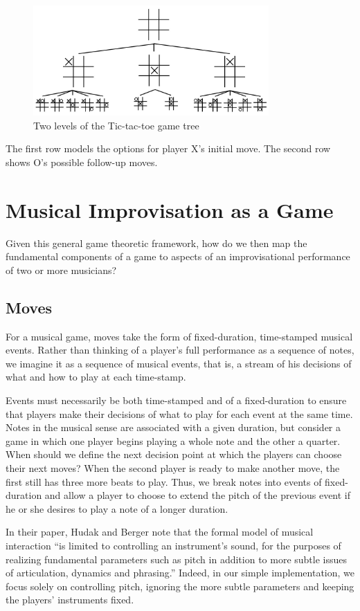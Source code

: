 \documentclass{article}
\begin{document}
\begin{figure}
\centering
\includegraphics[width=90mm]{ttt.jpg}
\caption{Two levels of the Tic-tac-toe game tree}
\end{figure}

The first row models the options for player X's initial move.  The second row 
shows O's possible follow-up moves.

\section{Musical Improvisation as a
Game}

Given this general game theoretic framework, how do we then map the
fundamental components of a game to aspects of an improvisational
performance of two or more musicians?

\subsection{Moves}
For a musical game, moves take the form of fixed-duration, time-stamped
musical events.\cite{hudakberger95}  Rather than thinking of a player's full performance as a
sequence of notes, we imagine it as a sequence of musical events, that
is, a stream of his decisions of what and how to play at each
time-stamp.

Events must necessarily be both time-stamped and of a fixed-duration to
ensure that players make their decisions of what to play for each event
at the same time. Notes in the musical sense are associated with a given
duration, but consider a game in which one player begins playing a whole
note and the other a quarter.  When should we define the next decision
point at which the players can choose their next moves? When the second
player is ready to make another move, the first still has three more
beats to play. Thus, we break notes into events of fixed-duration and
allow a player to choose to extend the pitch of the previous event if he
or she desires to play a note of a longer duration.

In their paper, Hudak and Berger note that the formal model of musical interaction
``is limited to controlling an instrument's sound, for the purposes of
realizing fundamental parameters such as pitch in addition to more
subtle issues of articulation, dynamics and phrasing.''\cite{hudakberger95}  Indeed, in our
simple implementation, we focus solely on controlling pitch, ignoring
the more subtle parameters and keeping the players' instruments fixed.
\end{document}
